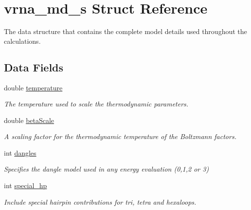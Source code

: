 \hypertarget{structvrna__md__s}{}\section{vrna\+\_\+md\+\_\+s Struct Reference}
\label{structvrna__md__s}


The data structure that contains the complete model details used throughout the calculations.  


\subsection*{Data Fields}
\begin{DoxyCompactItemize}
\item 
\mbox{\label{structvrna__md__s_a5f7e5c2b65bada5188443470e576aa4b}} 
double \mbox{\hyperlink{structvrna__md__s_a5f7e5c2b65bada5188443470e576aa4b}{temperature}}
\begin{DoxyCompactList}\small\item\em The temperature used to scale the thermodynamic parameters. \end{DoxyCompactList}\item 
\mbox{\label{structvrna__md__s_a19524bf1d8d7ab590ed36edbbcaaba2c}} 
double \mbox{\hyperlink{structvrna__md__s_a19524bf1d8d7ab590ed36edbbcaaba2c}{beta\+Scale}}
\begin{DoxyCompactList}\small\item\em A scaling factor for the thermodynamic temperature of the Boltzmann factors. \end{DoxyCompactList}\item 
int \mbox{\hyperlink{structvrna__md__s_adcda4ff2ea77748ae0e8700288282efc}{dangles}}
\begin{DoxyCompactList}\small\item\em Specifies the dangle model used in any energy evaluation (0,1,2 or 3) \end{DoxyCompactList}\item 
\mbox{\label{structvrna__md__s_add64a96d23e77ef1d0ddf8dfc5228143}} 
int \mbox{\hyperlink{structvrna__md__s_add64a96d23e77ef1d0ddf8dfc5228143}{special\+\_\+hp}}
\begin{DoxyCompactList}\small\item\em Include special hairpin contributions for tri, tetra and hexaloops. \end{DoxyCompactList}\item 

\end{DoxyCompactItemize}
